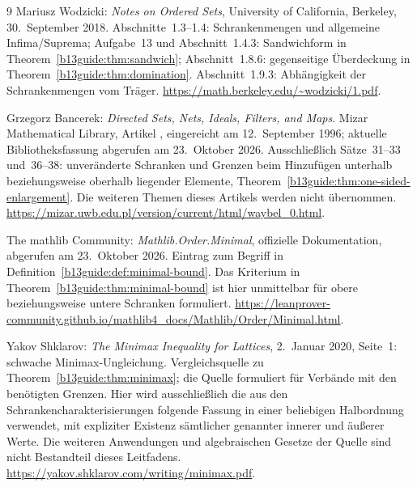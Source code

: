 \begin{thebibliography}{9}
\newpage
{}
Mariusz Wodzicki: \emph{Notes on Ordered Sets},
University of California, Berkeley, 30.~September 2018.
Abschnitte~1.3--1.4: Schrankenmengen und allgemeine Infima/Suprema;
Aufgabe~13 und Abschnitt~1.4.3: Sandwichform in
Theorem~\ref{b13guide:thm:sandwich};
Abschnitt~1.8.6: gegenseitige Überdeckung in
Theorem~\ref{b13guide:thm:domination}.
Abschnitt~1.9.3: Abhängigkeit der Schrankenmengen vom Träger.
\url{https://math.berkeley.edu/~wodzicki/1.pdf}.

Grzegorz Bancerek: \emph{Directed Sets, Nets, Ideals, Filters, and Maps}.
Mizar Mathematical Library, Artikel ,
eingereicht am 12.~September 1996; aktuelle Bibliotheksfassung
abgerufen am 23.~Oktober 2026.
Ausschließlich Sätze~31--33 und~36--38: unveränderte Schranken und
Grenzen beim Hinzufügen unterhalb beziehungsweise oberhalb liegender
Elemente, Theorem~\ref{b13guide:thm:one-sided-enlargement}.
Die weiteren Themen dieses Artikels werden nicht übernommen.
\url{https://mizar.uwb.edu.pl/version/current/html/waybel_0.html}.

The mathlib Community: \emph{Mathlib.Order.Minimal},
offizielle Dokumentation, abgerufen am 23.~Oktober 2026.
Eintrag  zum Begriff in
Definition~\ref{b13guide:def:minimal-bound}.
Das Kriterium in Theorem~\ref{b13guide:thm:minimal-bound} ist hier
unmittelbar für obere beziehungsweise untere Schranken formuliert.
\url{https://leanprover-community.github.io/mathlib4_docs/Mathlib/Order/Minimal.html}.

Yakov Shklarov: \emph{The Minimax Inequality for Lattices},
2.~Januar 2020, Seite~1: schwache Minimax-Ungleichung.
Vergleichsquelle zu Theorem~\ref{b13guide:thm:minimax}; die Quelle
formuliert für Verbände mit den benötigten Grenzen.
Hier wird ausschließlich die aus den Schrankencharakterisierungen
folgende Fassung in einer beliebigen Halbordnung verwendet,
mit expliziter Existenz sämtlicher genannter innerer und äußerer Werte.
Die weiteren Anwendungen und algebraischen Gesetze der Quelle
sind nicht Bestandteil dieses Leitfadens.
\url{https://yakov.shklarov.com/writing/minimax.pdf}.

\end{thebibliography}

